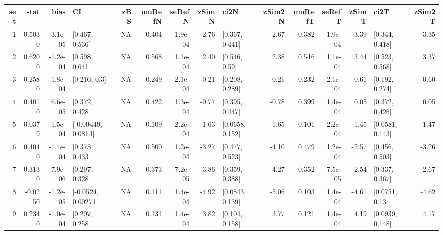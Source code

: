 
\begin{tabular}{r|r|r|l|r|r|r|r|l|r|r|r|r|l|r}
\hline
set & stat & bias & CI & zBS & muRefN & seRefN & zSimN & ci2N & zSim2N & muRefT & seRefT & zSimT & ci2T & zSim2T\\
\hline
1 & 0.5030 & -3.1e-05 & [0.467, 0.536] & NA & 0.404 & 1.9e-04 & 2.76 & [0.367, 0.441] & 2.67 & 0.382 & 1.9e-04 & 3.39 & [0.344, 0.418] & 3.35\\
\hline
2 & 0.6200 & -1.2e-04 & [0.598, 0.641] & NA & 0.568 & 1.1e-04 & 2.40 & [0.546, 0.59] & 2.38 & 0.546 & 1.1e-04 & 3.44 & [0.523, 0.568] & 3.37\\
\hline
3 & 0.2580 & -1.8e-04 & [0.216, 0.3] & NA & 0.249 & 2.1e-04 & 0.21 & [0.208, 0.289] & 0.21 & 0.232 & 2.1e-04 & 0.61 & [0.192, 0.274] & 0.60\\
\hline
4 & 0.4010 & 6.6e-05 & [0.372, 0.428] & NA & 0.422 & 1.3e-04 & -0.77 & [0.395, 0.447] & -0.78 & 0.399 & 1.4e-04 & 0.05 & [0.372, 0.426] & 0.05\\
\hline
5 & 0.0379 & -1.5e-04 & [-0.00449, 0.0814] & NA & 0.109 & 2.2e-04 & -1.63 & [0.0658, 0.152] & -1.65 & 0.101 & 2.2e-04 & -1.45 & [0.0581, 0.143] & -1.47\\
\hline
6 & 0.4040 & -1.4e-04 & [0.373, 0.433] & NA & 0.500 & 1.2e-04 & -3.27 & [0.477, 0.523] & -4.10 & 0.479 & 1.2e-04 & -2.57 & [0.456, 0.503] & -3.26\\
\hline
7 & 0.3130 & 7.9e-06 & [0.297, 0.328] & NA & 0.373 & 7.2e-05 & -3.86 & [0.359, 0.388] & -4.27 & 0.352 & 7.5e-05 & -2.54 & [0.337, 0.367] & -2.67\\
\hline
8 & -0.0250 & -1.2e-05 & [-0.0524, 0.00271] & NA & 0.111 & 1.4e-04 & -4.92 & [0.0843, 0.139] & -5.06 & 0.103 & 1.4e-04 & -4.61 & [0.0751, 0.13] & -4.62\\
\hline
9 & 0.2340 & -1.0e-04 & [0.207, 0.258] & NA & 0.131 & 1.4e-04 & 3.82 & [0.104, 0.158] & 3.77 & 0.121 & 1.4e-04 & 4.19 & [0.0939, 0.148] & 4.17\\
\hline
\end{tabular}

